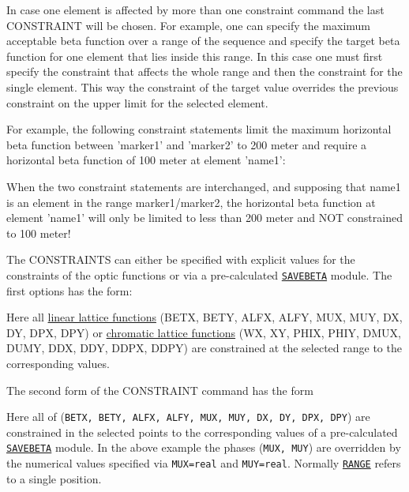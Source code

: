 In case one element is affected by more than one constraint command the
last CONSTRAINT will be chosen. For example, one can specify the
maximum acceptable beta function over a range of the sequence and
specify the target beta function for one element that lies inside this
range. In this case one must first specify the constraint that affects
the whole range and then the constraint for the single element. This way
the constraint of the target value overrides the previous constraint on
the upper limit for the selected element. 

For example, the following
constraint statements limit the maximum horizontal beta function between
'marker1' and 'marker2' to 200 meter and require a horizontal beta
function of 100 meter at element 'name1':  

When the two constraint statements are interchanged, and supposing that
name1 is an element in the range marker1/marker2, the horizontal beta 
function at element 'name1' will only be limited to less than 200 meter
and NOT constrained to 100 meter! 

The CONSTRAINTS can either be specified with explicit values for the
constraints of the optic functions or via a pre-calculated
\hyperref[sec:savebeta]{\tt SAVEBETA} module. The first
options has the form: 

Here all \href{../Introduction/tables.html#linear}{linear lattice functions} 
(BETX, BETY, ALFX, ALFY, MUX, MUY, DX, DY, DPX, DPY)
or \href{../Introduction/tables.html#chrom}{chromatic lattice functions}
(WX, XY, PHIX, PHIY, DMUX, DUMY, DDX, DDY, DDPX, DDPY)
are constrained at the selected range to the corresponding values.

The second form of the CONSTRAINT command has the form

Here all of ({\tt BETX, BETY, ALFX, ALFY, MUX, MUY, DX, DY, DPX, DPY})
are constrained in the selected points to the corresponding values
of a pre-calculated \hyperref[sec:savebeta]{\tt SAVEBETA} module.
In the above example the phases ({\tt MUX, MUY}) are overridden by the 
numerical values specified via {\tt MUX=real} and {\tt MUY=real}.
Normally \hyperref[sec:range]{\tt RANGE} refers to a single position.

